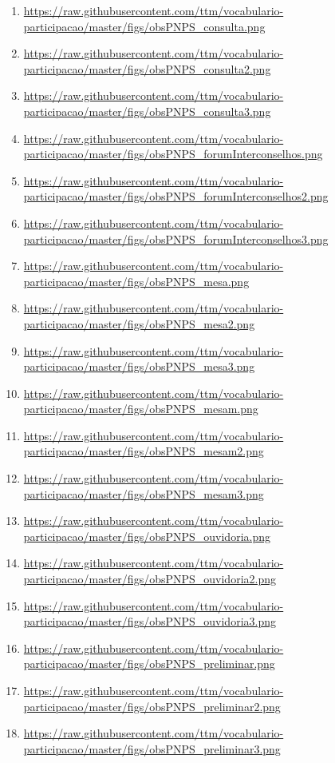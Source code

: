 \documentclass[12pt]{article}
\begin{document}
{\begin{enumerate}
    \item  \url{https://raw.githubusercontent.com/ttm/vocabulario-participacao/master/figs/obsPNPS_consulta.png}\label{i:76q}
    \item  \url{https://raw.githubusercontent.com/ttm/vocabulario-participacao/master/figs/obsPNPS_consulta2.png}\label{i:76r}
    \item  \url{https://raw.githubusercontent.com/ttm/vocabulario-participacao/master/figs/obsPNPS_consulta3.png}\label{i:76s}
    \item  \url{https://raw.githubusercontent.com/ttm/vocabulario-participacao/master/figs/obsPNPS_forumInterconselhos.png}\label{i:76t}
    \item  \url{https://raw.githubusercontent.com/ttm/vocabulario-participacao/master/figs/obsPNPS_forumInterconselhos2.png}\label{i:76u}
    \item  \url{https://raw.githubusercontent.com/ttm/vocabulario-participacao/master/figs/obsPNPS_forumInterconselhos3.png}\label{i:76v}
    \item  \url{https://raw.githubusercontent.com/ttm/vocabulario-participacao/master/figs/obsPNPS_mesa.png}\label{i:76x}
    \item  \url{https://raw.githubusercontent.com/ttm/vocabulario-participacao/master/figs/obsPNPS_mesa2.png}\label{i:76w}
    \item  \url{https://raw.githubusercontent.com/ttm/vocabulario-participacao/master/figs/obsPNPS_mesa3.png}\label{i:76z}
    \item  \url{https://raw.githubusercontent.com/ttm/vocabulario-participacao/master/figs/obsPNPS_mesam.png}\label{i:76aa}
    \item  \url{https://raw.githubusercontent.com/ttm/vocabulario-participacao/master/figs/obsPNPS_mesam2.png}\label{i:76bb}
    \item  \url{https://raw.githubusercontent.com/ttm/vocabulario-participacao/master/figs/obsPNPS_mesam3.png}\label{i:76cc}
    \item  \url{https://raw.githubusercontent.com/ttm/vocabulario-participacao/master/figs/obsPNPS_ouvidoria.png}\label{i:76dd}
    \item  \url{https://raw.githubusercontent.com/ttm/vocabulario-participacao/master/figs/obsPNPS_ouvidoria2.png}\label{i:76ee}
    \item  \url{https://raw.githubusercontent.com/ttm/vocabulario-participacao/master/figs/obsPNPS_ouvidoria3.png}\label{i:76ff}
    \item  \url{https://raw.githubusercontent.com/ttm/vocabulario-participacao/master/figs/obsPNPS_preliminar.png}\label{i:76gg}
    \item  \url{https://raw.githubusercontent.com/ttm/vocabulario-participacao/master/figs/obsPNPS_preliminar2.png}\label{i:76hh}
    \item  \url{https://raw.githubusercontent.com/ttm/vocabulario-participacao/master/figs/obsPNPS_preliminar3.png}\label{i:76ii}


\end{enumerate}}
\end{document}
